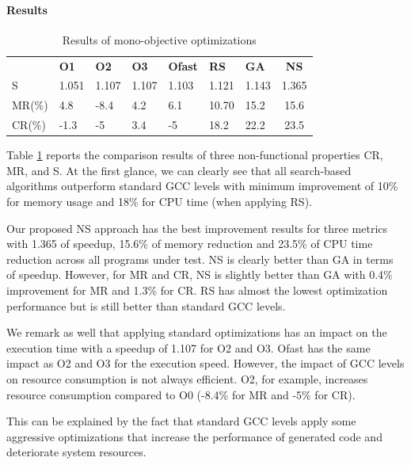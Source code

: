 \paragraph{Results}

\begin{table}[h]
	\centering
	\caption{Results of mono-objective optimizations}
	\label{my-label}
	\begin{tabular}{|l|l|l|l|l|l|l|c|}
		\hline
		& \textbf{O1}                    & \textbf{O2}                    & \textbf{O3}                    & \textbf{Ofast}                 & \textbf{RS}                    & \textbf{GA}                    & 
		\textbf{NS} \\
		\hhline{|=|=|=|=|=|=|=|=|}
		S  &  1.051 & 1.107  & 1.107  & 1.103  & 1.121  &  1.143 &  1.365  \\ \hline
		MR(\%) & 4.8  & -8.4  &  4.2 & 6.1  &  10.70 & 15.2  &  15.6  \\ \hline
		CR(\%) & -1.3  & -5  & 3.4  & -5  &  18.2 & 22.2  &  23.5  \\ \hline
	\end{tabular}
	\label{tab:Results of mono-objective optimizations}
\end{table}

Table \ref{tab:Results of mono-objective optimizations} reports the comparison results of three non-functional properties CR, MR, and S. At the first glance, we can clearly see that all search-based algorithms outperform standard GCC levels with minimum improvement of 10\% for memory usage and 18\% for CPU time (when applying RS).
 
Our proposed NS approach has the best improvement results for three metrics with 1.365 of speedup, 15.6\% of memory reduction and 23.5\% of CPU time reduction across all programs under test. NS is clearly better than GA in terms of speedup. However, for MR and CR, NS is slightly better than GA with 0.4\% improvement for MR and 1.3\% for CR. RS has almost the lowest optimization performance but is still better than standard GCC levels.

We remark as well that applying standard optimizations has an impact on the execution time with a speedup of 1.107 for O2 and O3. Ofast has the same impact as O2 and O3 for the execution speed. However, the impact of GCC levels on resource consumption is not always efficient. O2, for example, increases resource consumption compared to O0 (-8.4\% for MR and -5\% for CR). 

This can be explained by the fact that standard GCC levels apply some aggressive optimizations that increase the performance of generated code and deteriorate system resources.  


